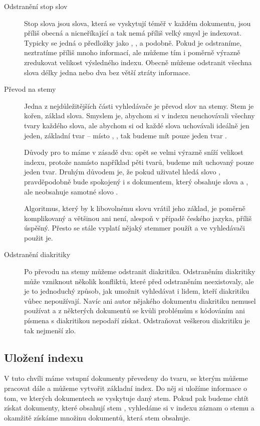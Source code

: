 \documentclass[12pt]{article}
\begin{document}
\begin{description}

\item[Odstranění stop slov] Stop slova jsou slova, která se vyskytují téměř v každém dokumentu, jsou příliš obecná a nicneříkající a tak nemá příliš velký smysl je indexovat. Typicky se jedná o předložky jako , ,  a podobně. Pokud je odstraníme, neztratíme příliš mnoho informací, ale můžeme tím i poměrně výrazně zredukovat velikost výsledného indexu. Obecně můžeme odstranit všechna slova délky jedna nebo dva bez větší ztráty informace. 

\item[Převod na stemy] Jedna z nejdůležitějších části vyhledávače je převod slov na stemy. Stem je kořen, základ slova. Smyslem je, abychom si v indexu neuchovávali všechny tvary každého slova, ale abychom si od každé slova uchovávali ideálně jen jeden, základní tvar -- místo , ,  tak budeme mít pouze jeden tvar .

Důvody pro to máme v zásadě dva: opět se velmi výrazně sníží velikost indexu, protože namísto například pěti tvarů, budeme mít uchovaný pouze jeden tvar. Druhým důvodem je, že pokud uživatel hledá slovo , pravděpodobně bude spokojený i s dokumentem, který obsahuje slova  a , ale neobsahuje samotné slovo . 

Algoritmus, který by k libovolnému slovu vrátil jeho základ, je poměrně komplikovaný a většinou ani není, alespoň v případě českého jazyka, příliš úspěšný. Přesto se stále vyplatí nějaký stemmer použít a ve vyhledávači použit je. 

\item[Odstranění diakritiky] Po převodu na stemy můžeme odstranit diakritiku. Odstraněním diakritiky může vzniknout několik konfliktů, které před odstraněním neexistovaly, ale je to jednoduchý způsob, jak umožnit vyhledávat i lidem, kteří diakritiku vůbec nepoužívají. Navíc ani autor nějakého dokumentu diakritiku nemusel používat a z některých dokumentů se kvůli problémům s kódováním ani písmena s diakritikou nepodaří získat. Odstraňovat veškerou diakritiku je tak nejmenší zlo. 
\end{description} 

\subsection{Uložení indexu}
V tuto chvíli máme vstupní dokumenty převedeny do tvaru, se kterým můžeme pracovat dále a můžeme vytvořit základní index. Do něj si uložíme informace o tom, ve kterých dokumentech se vyskytuje daný stem. Pokud pak budeme chtít získat dokumenty, které obsahují stem , vyhledáme si v indexu záznam o stemu  a okamžitě získáme množinu dokumentů, která stem obsahuje. 
\end{document}
